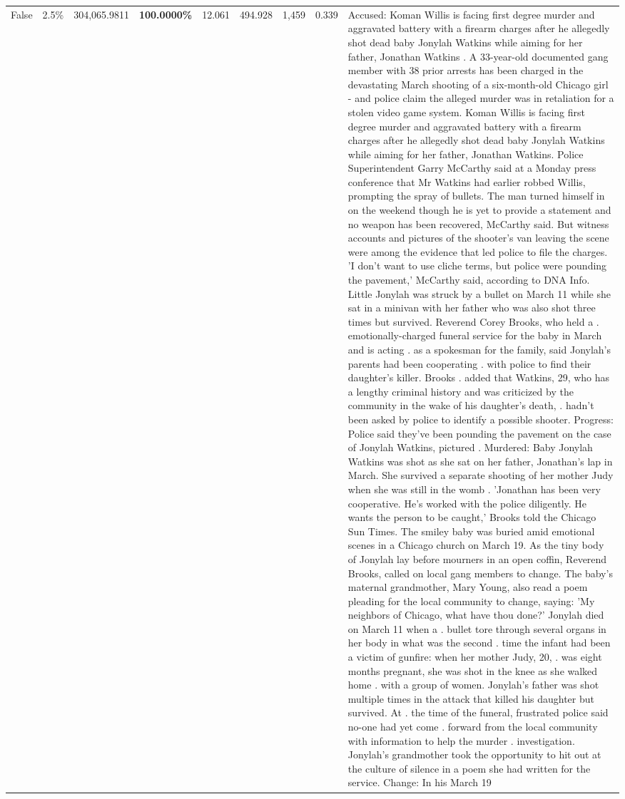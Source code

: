 \begin{table}[H]
\begin{tabular}{lllrlllll}
False & 2.5\% & \color{red} 304,065.9811 & \bfseries \color{red} 100.0000\% & 12.061 & 494.928 & 1,459 & 0.339 & Accused: Koman Willis is facing first degree murder and aggravated battery with a firearm charges after he allegedly shot dead baby Jonylah Watkins while aiming for her father, Jonathan Watkins . A 33-year-old documented gang member with 38 prior arrests has been charged in the devastating March shooting of a six-month-old Chicago girl - and police claim the alleged murder was in retaliation for a stolen video game system. Koman Willis is facing first degree murder and aggravated battery with a firearm charges after he allegedly shot dead baby Jonylah Watkins while aiming for her father, Jonathan Watkins. Police Superintendent Garry McCarthy said at a Monday press conference that Mr Watkins had earlier robbed Willis, prompting the spray of bullets. The man turned himself in on the weekend though he is yet to provide a statement and no weapon has been recovered, McCarthy said. But witness accounts and pictures of the shooter's van leaving the scene were among the evidence that led police to file the charges. 'I don't want to use cliche terms, but police were pounding the pavement,' McCarthy said, according to DNA Info. Little Jonylah was struck by a bullet on March 11 while she sat in a minivan with her father who was also shot three times but survived. Reverend Corey Brooks, who held a . emotionally-charged funeral service for the baby in March and is acting . as a spokesman for the family, said Jonylah's parents had been cooperating . with police to find their daughter's killer. Brooks . added that Watkins, 29, who has a lengthy criminal history and was criticized by the community in the wake of his daughter's death, . hadn't been asked by police to identify a possible shooter. Progress: Police said they've been pounding the pavement on the case of Jonylah Watkins, pictured . Murdered: Baby Jonylah Watkins was shot as she sat on her father, Jonathan's lap in March. She survived a separate shooting of her mother Judy when she was still in the womb . 'Jonathan has been very cooperative. He's worked with the police diligently. He wants the person to be caught,' Brooks told the Chicago Sun Times. The smiley baby was buried amid emotional scenes in a Chicago church on March 19. As the tiny body of Jonylah lay before mourners in an open coffin, Reverend Brooks, called on local gang members to change. The baby's maternal grandmother, Mary Young, also read a poem pleading for the local community to change, saying: 'My neighbors of Chicago, what have thou done?' Jonylah died on March 11 when a . bullet tore through several organs in her body in what was the second . time the infant had been a victim of gunfire: when her mother Judy, 20, . was eight months pregnant, she was shot in the knee as she walked home . with a group of women. Jonylah's father was shot multiple times in the attack that killed his daughter but survived. At . the time of the funeral, frustrated police said no-one had yet come . forward from the local community with information to help the murder . investigation. Jonylah's grandmother took the opportunity to hit out at the culture of silence in a poem she had written for the service. Change: In his March 19 
\end{tabular}
\end{table}
